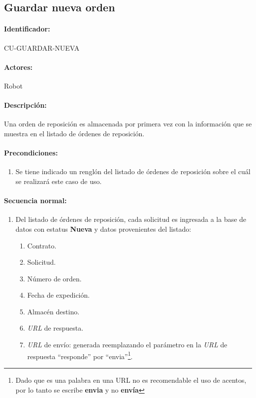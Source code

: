 \subsection{Guardar nueva orden}\label{cu-guardar-nueva}
\paragraph{Identificador:}
CU-GUARDAR-NUEVA
\paragraph{Actores:}
Robot
\paragraph{Descripción:}
Una orden de reposición es almacenada por primera vez con la información que se muestra en el listado de órdenes de reposición.
\paragraph{Precondiciones:}
\begin{enumerate}
  \item Se tiene indicado un renglón del listado de órdenes de reposición sobre el cuál se realizará este caso de uso.
\end{enumerate}
\paragraph{Secuencia normal:}
\begin{enumerate}
  \item Del listado de órdenes de reposición, cada solicitud es ingresada a la base de datos con estatus \textbf{Nueva} y datos provenientes del listado:
  \begin{enumerate}
    \item Contrato.
    \item Solicitud.
    \item Número de orden.
    \item Fecha de expedición.
    \item Almacén destino.
    \item \textit{URL} de respuesta.
    \item \textit{URL} de envío: generada reemplazando el parámetro en la \textit{URL} de respuesta ``responde'' por ``envia''\footnote{Dado que es una palabra en una URL no es recomendable el uso de acentos, por lo tanto se escribe \textbf{envia} y no \textbf{envía}}.
  \end{enumerate}
\end{enumerate}
